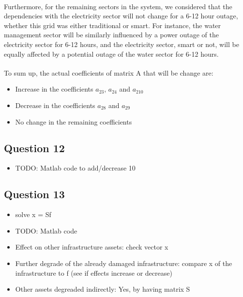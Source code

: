 \documentclass[11pt,a4paper]{article}
\begin{document}
\\ 
Furthermore, for the remaining sectors in the system, we considered that the dependencies with the electricity sector will not change for a 6-12 hour outage, whether this grid was either traditional or smart. For instance, the water management sector will be similarly influenced by a power outage of the electricity sector for 6-12 hours, and the electricity sector, smart or not, will be equally affected by a potential outage of the water sector for 6-12 hours.\\
\\
To sum up, the actual coefficients of matrix A that will be change are: 
\begin{itemize}
	\item Increase in the coefficients $a_{23}$, $a_{24}$ and $a_{210}$
	\item Decrease in the coefficients $a_{28}$ and $a_{29}$
	\item No change in the remaining coefficients
\end{itemize}

\subsection*{Question 12}
\begin{itemize}
	\item TODO: Matlab code to add/decrease 10%
\end{itemize}

\subsection*{Question 13}
\begin{itemize}
	\item solve x = Sf
	\item TODO: Matlab code
	\item Effect on other infrastructure assets: check vector x
	\item Further degrade of the already damaged infrastructure: compare x of the infrastructure to f (see if effects increase or decrease)
	\item Other assets degreaded indirectly: Yes, by having matrix S
\end{itemize}
\end{document}
